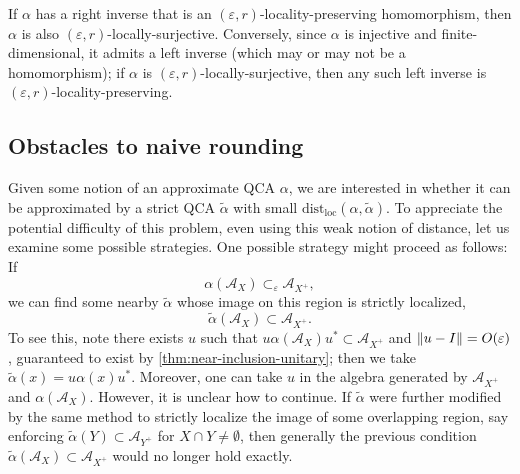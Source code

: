 \documentclass[11pt,reqno]{amsart}
\theoremstyle{definition}
\theoremstyle{remark}
\numberwithin{equation}{section}
\newcommand{\eps}{\varepsilon}
\newcommand{\cA}{\mathcal A}
\DeclarePairedDelimiter\norm{\lVert}{\rVert}
\newcommand{\distloc}{\mathrm{dist}_\mathrm{loc}}
\begin{document}
If $\alpha$ has a right inverse that is an $(\eps,r)$-locality-preserving homomorphism, then $\alpha$ is also $(\eps,r)$-locally-surjective.
Conversely, since $\alpha$ is injective and finite-dimensional, it admits a left inverse (which may or may not be a homomorphism); if $\alpha$ is $(\eps,r)$-locally-surjective, then any such left inverse is $(\eps,r)$-locality-preserving.

\subsection{Obstacles to naive rounding}
Given some notion of an approximate QCA $\alpha$, we are interested in whether it can be approximated by a strict QCA $\tilde \alpha$ with small $\distloc(\alpha,\tilde \alpha)$.
To appreciate the potential difficulty of this problem, even using this weak notion of distance, let us examine some possible strategies.
One possible strategy might proceed as follows: If
\[
\alpha(\cA_X) \subset_\eps \cA_{X^+},
\]
we can find some nearby $\tilde \alpha$ whose image on this region is strictly localized,
\[
\tilde \alpha(\cA_X) \subset \cA_{X^+}.
\]
To see this, note there exists $u$ such that $u \alpha(\cA_X) u^* \subset \cA_{X^+}$ and $\norm{u-I}=O(\eps)$, guaranteed to exist by \cref{thm:near-inclusion-unitary}; then we take $\tilde \alpha(x) = u \alpha(x) u^*.$
Moreover, one can take $u$ in the algebra generated by $\cA_{X^+}$ and $\alpha(\cA_X)$.
However, it is unclear how to continue.
If $\tilde \alpha$ were further modified by the same method to strictly localize the image of some overlapping region, say enforcing $\tilde \alpha(Y) \subset \cA_{Y^+}$ for $X \cap Y \neq \emptyset$,
then generally the previous condition $\tilde \alpha(\cA_X) \subset \cA_{X^+}$ would no longer hold exactly.
\end{document}
